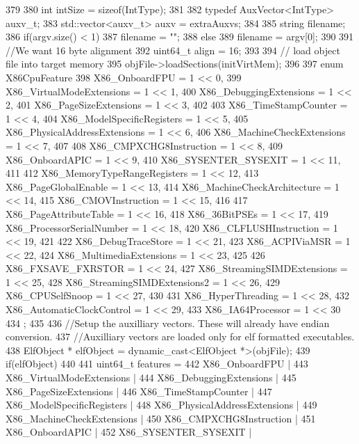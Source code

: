 \begin{DoxyCode}
379 {
380     int intSize = sizeof(IntType);
381 
382     typedef AuxVector<IntType> auxv_t;
383     std::vector<auxv_t> auxv = extraAuxvs;
384 
385     string filename;
386     if(argv.size() < 1)
387         filename = "";
388     else
389         filename = argv[0];
390 
391     //We want 16 byte alignment
392     uint64_t align = 16;
393 
394     // load object file into target memory
395     objFile->loadSections(initVirtMem);
396 
397     enum X86CpuFeature {
398         X86_OnboardFPU = 1 << 0,
399         X86_VirtualModeExtensions = 1 << 1,
400         X86_DebuggingExtensions = 1 << 2,
401         X86_PageSizeExtensions = 1 << 3,
402 
403         X86_TimeStampCounter = 1 << 4,
404         X86_ModelSpecificRegisters = 1 << 5,
405         X86_PhysicalAddressExtensions = 1 << 6,
406         X86_MachineCheckExtensions = 1 << 7,
407 
408         X86_CMPXCHG8Instruction = 1 << 8,
409         X86_OnboardAPIC = 1 << 9,
410         X86_SYSENTER_SYSEXIT = 1 << 11,
411 
412         X86_MemoryTypeRangeRegisters = 1 << 12,
413         X86_PageGlobalEnable = 1 << 13,
414         X86_MachineCheckArchitecture = 1 << 14,
415         X86_CMOVInstruction = 1 << 15,
416 
417         X86_PageAttributeTable = 1 << 16,
418         X86_36BitPSEs = 1 << 17,
419         X86_ProcessorSerialNumber = 1 << 18,
420         X86_CLFLUSHInstruction = 1 << 19,
421 
422         X86_DebugTraceStore = 1 << 21,
423         X86_ACPIViaMSR = 1 << 22,
424         X86_MultimediaExtensions = 1 << 23,
425 
426         X86_FXSAVE_FXRSTOR = 1 << 24,
427         X86_StreamingSIMDExtensions = 1 << 25,
428         X86_StreamingSIMDExtensions2 = 1 << 26,
429         X86_CPUSelfSnoop = 1 << 27,
430 
431         X86_HyperThreading = 1 << 28,
432         X86_AutomaticClockControl = 1 << 29,
433         X86_IA64Processor = 1 << 30
434     };
435 
436     //Setup the auxilliary vectors. These will already have endian conversion.
437     //Auxilliary vectors are loaded only for elf formatted executables.
438     ElfObject * elfObject = dynamic_cast<ElfObject *>(objFile);
439     if(elfObject)
440     {
441         uint64_t features =
442             X86_OnboardFPU |
443             X86_VirtualModeExtensions |
444             X86_DebuggingExtensions |
445             X86_PageSizeExtensions |
446             X86_TimeStampCounter |
447             X86_ModelSpecificRegisters |
448             X86_PhysicalAddressExtensions |
449             X86_MachineCheckExtensions |
450             X86_CMPXCHG8Instruction |
451             X86_OnboardAPIC |
452             X86_SYSENTER_SYSEXIT |
}}
\end{DoxyCode}
